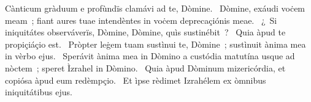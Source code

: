 { Cànticum gràduum}
{%
e profùndïs clamávi ad te, Dòmine. 
~Dòmine, exáudi voċem meam~; fiant aures tuae intendèntes in voċem deprecaçiónis meae. 
~¿~Si iniquitátes observáverïs, Dòmine, Dòmine, quìs sustinébit~? 
~Quia àpud te propiçiáçio est. 
~Pròpter leġem tuam sustìnui te, Dòmine~; sustìnuit ànima mea in vèrbo ejus. 
~Sperávit ànima mea in Dòmino a custódia matutína usque ad nòctem~; speret Ìzrahel in Dòmino. 
~Quia àpud Dòminum mizericórdia, et copiósa àpud eum redèmpçio. 
~Et ìpse rèdimet Izrahélem ex òmnibus iniquitátibus ejus. 
}
